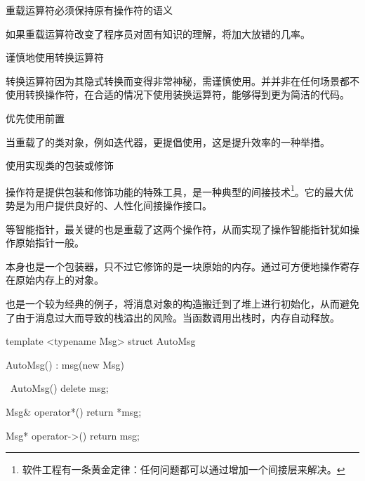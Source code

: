 \begin{content}

\begin{regulation}
重载运算符必须保持原有操作符的语义
\end{regulation}

如果重载运算符改变了程序员对固有知识的理解，将加大放错的几率。

\begin{regulation}
谨慎地使用转换运算符
\end{regulation}

转换运算符因为其隐式转换而变得非常神秘，需谨慎使用。并并非在任何场景都不使用转换操作符，在合适的情况下使用装换运算符，能够得到更为简洁的代码。

\begin{regulation}
优先使用前置
\end{regulation}

当重载了的类对象，例如迭代器，更提倡使用，这是提升效率的一种举措。

\begin{regulation}
使用实现类的包装或修饰
\end{regulation}

操作符是提供包装和修饰功能的特殊工具，是一种典型的间接技术\footnote{软件工程有一条黄金定律：任何问题都可以通过增加一个间接层来解决。}。它的最大优势是为用户提供良好的、人性化间接操作接口。

等智能指针，最关键的也是重载了这两个操作符，从而实现了操作智能指针犹如操作原始指针一般。

本身也是一个包装器，只不过它修饰的是一块原始的内存。通过可方便地操作寄存在原始内存上的对象。

也是一个较为经典的例子，将消息对象的构造搬迁到了堆上进行初始化，从而避免了由于消息过大而导致的栈溢出的风险。当函数调用出栈时，内存自动释放。

\begin{leftbar}
\begin{c++}
template <typename Msg>
struct AutoMsg
{
    AutoMsg() : msg(new Msg)
    {}
    
    ~AutoMsg()
    {
        delete msg;
    }
    
    Msg& operator*()
    {
        return *msg;
    }
    
    Msg* operator->()
    {
        return msg;
    }
    
}
\end{c++}
\end{leftbar}
\end{content}
